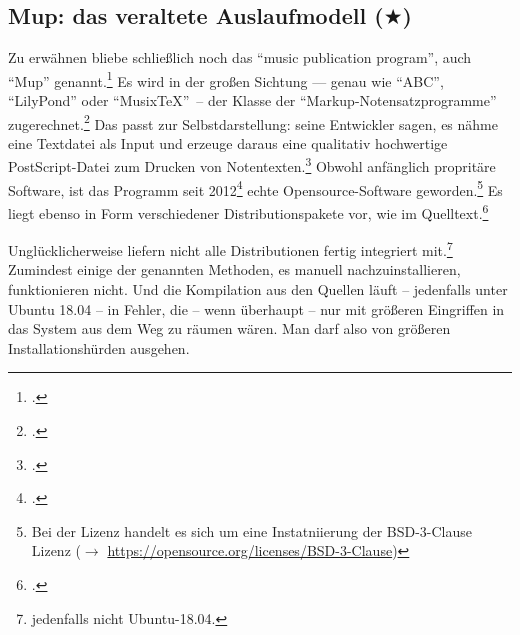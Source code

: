 %
%
%



\subsection{Mup: das veraltete Auslaufmodell ($\bigstar$)}

Zu erwähnen bliebe schließlich noch das \enquote{music publication program},
auch \enquote{Mup} genannt.\footcite[vgl.][\nopage wp]{Arkka2017a} Es wird in
der großen Sichtung --- genau wie \enquote{ABC}, \enquote{LilyPond} oder
\enquote{Musix\TeX}\ -- der Klasse der \enquote{Markup-Notensatzprogramme}
zugerechnet.\footcite[vgl.][\nopage wp]{WpedNotensatz2019a} Das passt zur
Selbstdarstellung: seine Entwickler sagen, es nähme eine Textdatei als Input
und erzeuge daraus eine qualitativ hochwertige PostScript-Datei zum Drucken von
Notentexten.\footcite[vgl.][\nopage wp]{Arkka2017a} Obwohl anfänglich propritäre
Software, ist das Programm seit 2012\footcite[vgl.][\nopage wp]{Arkka2017a}
echte Opensource-Software geworden.\footnote{\cite[vgl.][\nopage wp]{Arkka2017b}
Bei der Lizenz handelt es sich um eine Instatniierung der BSD-3-Clause Lizenz
($\rightarrow$ \href{https://opensource.org/licenses/BSD-3-Clause}
{https://opensource.org/licenses/BSD-3-Clause})} Es liegt ebenso in Form
verschiedener Distributionspakete vor, wie im Quelltext.\footcite[vgl.][\nopage
wp]{Arkka2017c}

Unglücklicherweise liefern nicht alle Distributionen  fertig integriert
mit.\footnote{jedenfalls nicht Ubuntu-18.04.} Zumindest einige der genannten
Methoden, es manuell nachzuinstallieren, funktionieren nicht. Und die
Kompilation aus den Quellen läuft -- jedenfalls unter Ubuntu 18.04 -- in Fehler,
die -- wenn überhaupt -- nur mit größeren Eingriffen in das System aus dem Weg
zu räumen wären. Man darf also von größeren Installationshürden ausgehen.

